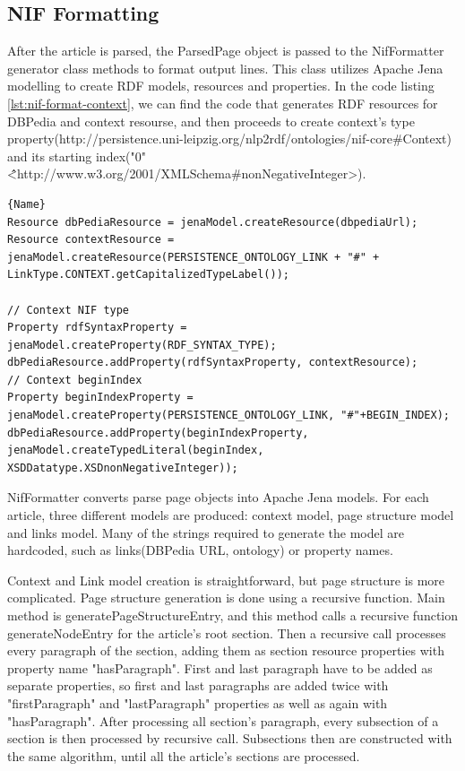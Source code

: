 \documentclass[thesis=M,english,hidelinks]{FITthesis}[2019/12/23]
\begin{document}
\subsection{NIF Formatting}

After the article is parsed, the ParsedPage object is passed to the NifFormatter generator class methods to format output lines. This class utilizes Apache Jena modelling to create \gls{RDF} models, resources and properties. In the code listing \ref{lst:nif-format-context}, we can find the code that generates \gls{RDF} resources for DBPedia and context resourse, and then proceeds to create context's type property(http://persistence.uni-leipzig.org/nlp2rdf/ontologies/nif-core\#Context) and its starting index("0"\^\^<http://www.w3.org/2001/XMLSchema\#nonNegativeInteger>).

\begin{lstlisting}[caption=Generating Apache Jena context model,frame=tlrb,  label = {lst:nif-format-context}]{Name}
Resource dbPediaResource = jenaModel.createResource(dbpediaUrl);
Resource contextResource = jenaModel.createResource(PERSISTENCE_ONTOLOGY_LINK + "#" + LinkType.CONTEXT.getCapitalizedTypeLabel());

// Context NIF type
Property rdfSyntaxProperty = jenaModel.createProperty(RDF_SYNTAX_TYPE);
dbPediaResource.addProperty(rdfSyntaxProperty, contextResource);
// Context beginIndex
Property beginIndexProperty = jenaModel.createProperty(PERSISTENCE_ONTOLOGY_LINK, "#"+BEGIN_INDEX);
dbPediaResource.addProperty(beginIndexProperty, jenaModel.createTypedLiteral(beginIndex, XSDDatatype.XSDnonNegativeInteger));
\end{lstlisting}

NifFormatter converts parse page objects into Apache Jena models. For each article, three different models are produced: context model, page structure model and links model. Many of the strings required to generate the model are hardcoded, such as links(DBPedia URL, ontology) or property names. 

Context and Link model creation is straightforward, but page structure is more complicated. Page structure generation is done using a  recursive function. Main method is generatePageStructureEntry, and this method calls a recursive function generateNodeEntry for the article's root section. Then a recursive call processes every paragraph of the section, adding them as section resource properties with property name "hasParagraph". First and last paragraph have to be added as separate properties, so first and last paragraphs are added twice with "firstParagraph" and "lastParagraph" properties as well as again with "hasParagraph".  After processing all section's paragraph, every subsection of a section is then processed by recursive call. Subsections then are constructed with the same algorithm, until all the article's sections are processed.
\end{document}

